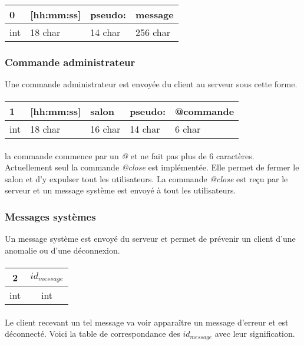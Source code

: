 \documentclass[a4paper, 12pt]{article}
\begin{document}
\paragraph{}
 \begin{tabular}{|p{0.5cm}|p{2cm}|p{1.5cm}|p{5cm}| }
  \hline			
    0 & [hh:mm:ss] & pseudo: & message \\
  \hline		
    int & 18 char & 14 char & 256 char \\
  \hline  
  \end{tabular}
\subsubsection{Commande administrateur}
Une commande administrateur est envoyée du client au serveur sous cette forme.
\paragraph{}
\begin{tabular}{|p{0.5cm}|p{2cm}|p{1.6cm}|p{1.5cm}|p{5cm}| }
 \hline			
  1 & [hh:mm:ss] & salon & pseudo: & @commande \\
 \hline		
  int & 18 char & 16 char & 14 char & 6 char \\
 \hline  
 \end{tabular}
 \paragraph{}
la commande commence par un \emph{@} et ne fait pas plus de 6 caractères.
Actuellement seul la commande \emph{@close} est implémentée. Elle permet de fermer le salon et d'y expulser tout les utilisateurs.
La commande \emph{@close} est reçu par le serveur et un message système est envoyé à tout les utilisateurs.
\subsubsection{Messages systèmes}
Un message système est envoyé du serveur et permet de prévenir un client d'une anomalie ou d'une déconnexion.
\paragraph{}
\begin{tabular}{|c|c|}
 \hline			
   2 & $id_{message}$\\
 \hline		
   int & int \\
 \hline  
 \end{tabular}
\paragraph{}
Le client recevant un tel message va voir apparaître un message d'erreur et est déconnecté.
Voici la table de correspondance des $id_{message}$ avec leur signification.
\end{document}
